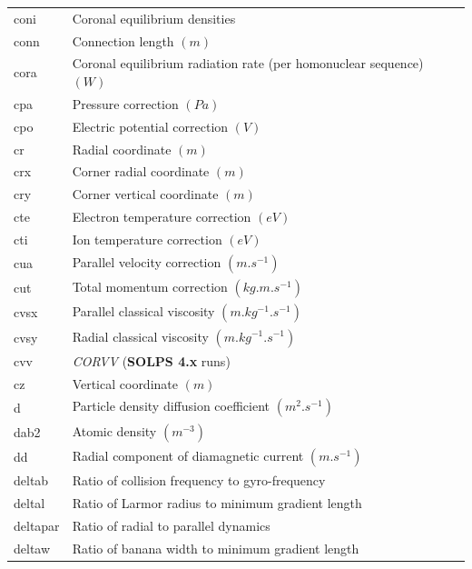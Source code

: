 \documentclass[a4paper,10pt]{report}
\newcommand\SOLPSfour{{\bf SOLPS 4.x} }
\begin{document}
\begin{center}
\begin{longtable}{|l|l|}
    coni     & \index{b2plot, coni} Coronal equilibrium densities \\
    conn     & \index{b2plot, conn} Connection length $(m)$ \\
    cora     & \index{b2plot, cora} Coronal equilibrium radiation rate (per homonuclear sequence) $(W)$ \\
    cpa      & \index{b2plot, cpa} Pressure correction $(Pa)$ \\
    cpo      & \index{b2plot, cpo} Electric potential correction $(V)$ \\
    cr       & \index{b2plot, cr} Radial coordinate $(m)$ \\
    crx      & \index{b2plot, crx} Corner radial coordinate $(m)$ \\
    cry      & \index{b2plot, cry} Corner vertical coordinate $(m)$ \\
    cte      & \index{b2plot, cte} Electron temperature correction $(eV)$ \\
    cti      & \index{b2plot, cti} Ion temperature correction $(eV)$ \\
    cua      & \index{b2plot, cua} Parallel velocity correction $(m.s^{-1})$ \\
    cut      & \index{b2plot, cut} Total momentum correction $(kg.m.s^{-1})$ \\
    cvsx     & \index{b2plot, cvsx} Parallel classical viscosity $(m.kg^{-1}.s^{-1})$ \\
    cvsy     & \index{b2plot, cvsy} Radial classical viscosity $(m.kg^{-1}.s^{-1})$ \\
    cvv      & \index{b2plot, cvv} {\em CORVV} (\SOLPSfour runs) \\
    cz       & \index{b2plot, cz} Vertical coordinate $(m)$ \\
    d        & \index{b2plot, d} Particle density diffusion coefficient $(m^2.s^{-1})$ \\
    dab2     & \index{b2plot, dab2} Atomic density $(m^{-3})$ \\
    dd       & \index{b2plot, dd} Radial component of diamagnetic current $(m.s^{-1})$ \\
    deltab   & \index{b2plot, deltab} Ratio of collision frequency to gyro-frequency \\
    deltal   & \index{b2plot, deltal} Ratio of Larmor radius to minimum gradient length \\
    deltapar & \index{b2plot, deltapar} Ratio of radial to parallel dynamics \\
    deltaw   & \index{b2plot, deltaw} Ratio of banana width to minimum gradient length \\

\end{longtable}
\end{center}
\end{document}

